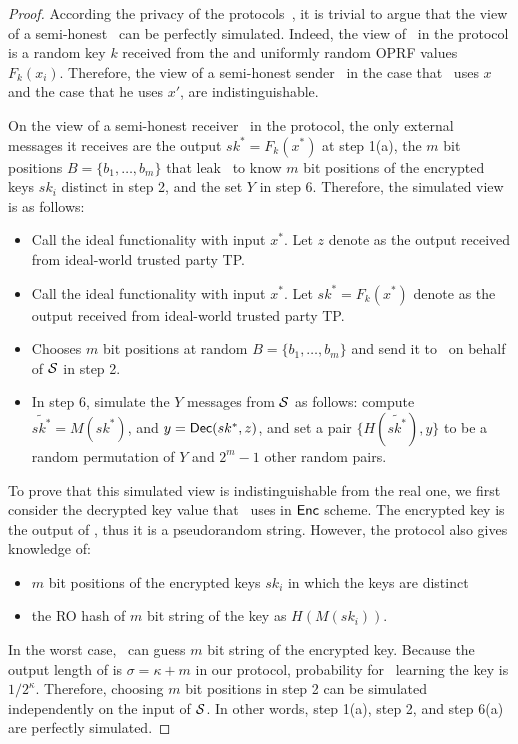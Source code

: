 \begin{proof}
	
	\medskip
	According the privacy of the \batchOPRF protocols~\cite{CCS:KKRT16}, it is trivial to argue that the view of a semi-honest \SS\ can be perfectly simulated. Indeed, the view of \SS\ in the protocol is a random key $k$ received from the \batchOPRF and uniformly random OPRF values $F_k(x_i)$. Therefore, the view of a semi-honest sender \SS\, in the case that \RR\  uses $x$ and the case that he uses  $x'$, are indistinguishable. 
	
	\medskip
	 On the view of a semi-honest receiver \RR\ in the protocol, the only external messages it receives are the \batchOPRF output $sk^*=F_k(x^*)$ at step 1(a), the $m$ bit positions $B=\{b_1,  \ldots, b_m\}$ that leak \RR\ to know $m$ bit positions of the encrypted keys $sk_i$ distinct in step 2, and the set $Y$ in step 6. Therefore, the simulated view is as follows:
	\begin{itemize}
		\item Call the ideal \OPPRF functionality with input $x^*$. Let $z$ denote as the output received from ideal-world trusted party TP.
		
		\item Call the ideal \batchOPRF functionality with input $x^*$. Let $sk^*=F_k(x^*)$ denote as the output received from ideal-world trusted party TP.
		
		
		\item Chooses $m$ bit positions at random $B=\{b_1,  \ldots, b_m\}$ and send it to \RR\ on behalf of $\mathcal{S}$ in step 2.
		
		\item In step 6, simulate the $Y$ messages from $\mathcal{S}$ as follows:
		compute  $\tilde{sk^*} = M( sk^*)$, and $ y= \mathsf{Dec}( sk^*, z)$, and set a pair $\{H(\tilde{sk^*}), y \}$ to be a random permutation of $Y$ and $2^m-1$ other random pairs.
		
	\end{itemize}
	
	To prove that this simulated view is indistinguishable from the real one, we first consider the decrypted key value that \SS\ uses in $\mathsf{Enc}$ scheme. The encrypted key is the output of \batchOPRF, thus it is a pseudorandom string. However, the protocol also gives knowledge of:
		\begin{itemize}
		\item $m$ bit positions of the encrypted keys $sk_i$ in which the keys are distinct  
		\item	the RO hash of $m$ bit string of the key as $H(M( sk_i))$.
       \end{itemize}
	 In the worst case, \RR\ can guess $m$ bit string of the encrypted key. Because the output length of \batchOPRF is $\sigma=\kappa+m$ in our protocol, probability for \RR\ learning the key is $1/2^\kappa$. Therefore, choosing $m$ bit positions in step 2 can be simulated independently on the input of $\mathcal{S}$. In other words, step 1(a), step 2, and step 6(a) are perfectly simulated.
	

\end{proof}
